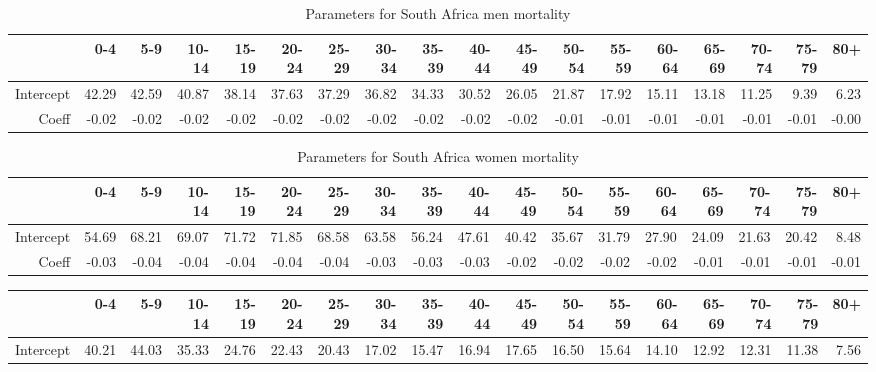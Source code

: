 \documentclass{article}
\begin{document}
\begin{landscape}
\begin{table}[ht]
\centering
\begingroup\small
\begin{tabular}{rrrrrrrrrrrrrrrrrr}
  \hline
 & 0-4 & 5-9 & 10-14 & 15-19 & 20-24 & 25-29 & 30-34 & 35-39 & 40-44 & 45-49 & 50-54 & 55-59 & 60-64 & 65-69 & 70-74 & 75-79 & 80+ \\ 
  \hline
Intercept & 42.29 & 42.59 & 40.87 & 38.14 & 37.63 & 37.29 & 36.82 & 34.33 & 30.52 & 26.05 & 21.87 & 17.92 & 15.11 & 13.18 & 11.25 & 9.39 & 6.23 \\ 
  Coeff & -0.02 & -0.02 & -0.02 & -0.02 & -0.02 & -0.02 & -0.02 & -0.02 & -0.02 & -0.02 & -0.01 & -0.01 & -0.01 & -0.01 & -0.01 & -0.01 & -0.00 \\ 
   \hline
\end{tabular}
\endgroup
\caption{Parameters for South Africa men mortality} 
\end{table}%
\begin{table}[ht]
\centering
\begingroup\small
\begin{tabular}{rrrrrrrrrrrrrrrrrr}
  \hline
 & 0-4 & 5-9 & 10-14 & 15-19 & 20-24 & 25-29 & 30-34 & 35-39 & 40-44 & 45-49 & 50-54 & 55-59 & 60-64 & 65-69 & 70-74 & 75-79 & 80+ \\ 
  \hline
Intercept & 54.69 & 68.21 & 69.07 & 71.72 & 71.85 & 68.58 & 63.58 & 56.24 & 47.61 & 40.42 & 35.67 & 31.79 & 27.90 & 24.09 & 21.63 & 20.42 & 8.48 \\ 
  Coeff & -0.03 & -0.04 & -0.04 & -0.04 & -0.04 & -0.04 & -0.03 & -0.03 & -0.03 & -0.02 & -0.02 & -0.02 & -0.02 & -0.01 & -0.01 & -0.01 & -0.01 \\ 
   \hline
\end{tabular}
\endgroup
\caption{Parameters for South Africa women mortality} 
\end{table}%
\begin{table}[ht]
\centering
\begingroup\small
\begin{tabular}{rrrrrrrrrrrrrrrrrr}
  \hline
 & 0-4 & 5-9 & 10-14 & 15-19 & 20-24 & 25-29 & 30-34 & 35-39 & 40-44 & 45-49 & 50-54 & 55-59 & 60-64 & 65-69 & 70-74 & 75-79 & 80+ \\ 
  \hline
Intercept & 40.21 & 44.03 & 35.33 & 24.76 & 22.43 & 20.43 & 17.02 & 15.47 & 16.94 & 17.65 & 16.50 & 15.64 & 14.10 & 12.92 & 12.31 & 11.38 & 7.56 \\ 

\end{tabular}
\end{table}
\end{landscape}
\end{document}
